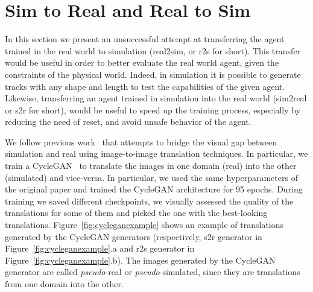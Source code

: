 \section{Sim to Real and Real to Sim}

In this section we present an unsuccessful attempt at transferring the agent trained in the real world to simulation (real2sim, or r2s for short). This transfer would be useful in order to better evaluate the real world agent, given the constraints of the physical world. Indeed, in simulation it is possible to generate tracks with any shape and length to test the capabilities of the given agent. Likewise, transferring an agent trained in simulation into the real world (sim2real or s2r for short), would be useful to speed up the training process, especially by reducing the need of reset, and avoid unsafe behavior of the agent.



We follow previous work~\cite{stocco-mind} that attempts to bridge the visual gap between simulation and real using image-to-image translation techniques. In particular, we train a CycleGAN~\cite{CycleGAN2017} to translate the images in one domain (real) into the other (simulated) and vice-versa. In particular, we used the same hyperparameters of the original paper and trained the CycleGAN architecture for 95 epochs. During training we saved different checkpoints, we visually assessed the quality of the translations for some of them and picked the one with the best-looking translations. Figure~\ref{fig:cycleganexample} shows an example of translations generated by the CycleGAN generators (respectively, s2r generator in Figure~\ref{fig:cycleganexample}.a and r2s generator in Figure~\ref{fig:cycleganexample}.b). The images generated by the CycleGAN generator are called \textit{pseudo}-real or \textit{pseudo}-simulated, since they are translations from one domain into the other.

